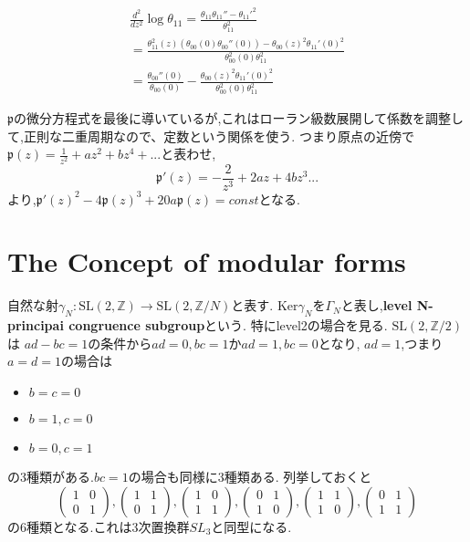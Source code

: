 \documentclass[uplatex,b5j,11pt]{jsbook}
\begin{document}
\begin{align*}
    \frac{d^2}{dz^2} \log \theta_{11} = \frac{\theta_{11}\theta_{11}'' - \theta_{11}'^2}{ \theta_{11}^2} \\
    =\frac{\theta_{11}^2(z) (\theta_{00}(0) \theta_{00}''(0) )  - \theta_{00}(z)^2 \theta_{11}'(0)^2 }{\theta_{00}^2(0) \theta_{11}^2} \\
    = \frac{\theta_{00}''(0)}{\theta_{00}(0)} - \frac{\theta_{00}(z)^2 \theta_{11}'(0)^2 }{\theta_{00}^2(0) \theta_{11}^2}
\end{align*}

$\mathfrak{p}$の微分方程式を最後に導いているが,これはローラン級数展開して係数を調整して,正則な二重周期なので、定数という関係を使う.
つまり原点の近傍で$\mathfrak{p}(z) = \frac{1}{z^2} + az^2 + bz^4 + ...$と表わせ,
\begin{equation*}
    \mathfrak{p}'(z) = - \frac{2}{z^3} + 2az + 4bz^3...
\end{equation*}
より,$\mathfrak{p}'(z)^2 - 4 \mathfrak{p}(z)^3 + 20 a \mathfrak{p}(z) = const$となる.




\section{The Concept of modular forms}

自然な射$\gamma_N: \mathrm{SL}(2, \mathbb{Z})  \to \mathrm{SL}(2, \mathbb{Z}/N)$と表す.
$\mathrm{Ker}\gamma_N$を$\Gamma_N$と表し,\textbf{level N-principai congruence subgroup}という.
特にlevel2の場合を見る.
$\mathrm{SL}(2, \mathbb{Z}/2)$は
$ad -bc =1$の条件から$ad =0,bc=1$か$ad=1,bc=0$となり,
$ad=1$,つまり$a=d=1$の場合は
\begin{itemize}
    \item $b=c=0$
    \item $b=1, c=0$
    \item $b=0, c=1$
\end{itemize}
の3種類がある.$bc=1$の場合も同様に3種類ある.
列挙しておくと
\begin{equation*}
\begin{pmatrix}
1 & 0 \\
0 & 1
\end{pmatrix},
\begin{pmatrix}
1 & 1 \\
0 & 1
\end{pmatrix},
\begin{pmatrix}
1 & 0 \\
1 & 1
\end{pmatrix},
\begin{pmatrix}
0 & 1 \\
1 & 0
\end{pmatrix},
\begin{pmatrix}
1 & 1 \\
1 & 0
\end{pmatrix},
\begin{pmatrix}
0 & 1 \\
1 & 1
\end{pmatrix}
\end{equation*}
の6種類となる.これは3次置換群$SL_3$と同型になる.
\end{document}
